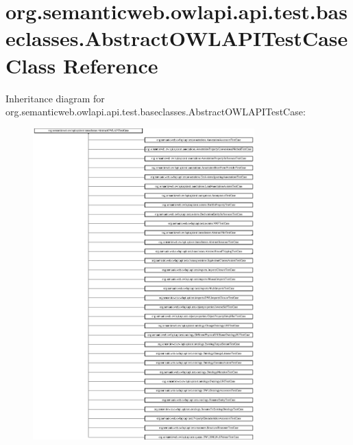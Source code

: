 \hypertarget{classorg_1_1semanticweb_1_1owlapi_1_1api_1_1test_1_1baseclasses_1_1_abstract_o_w_l_a_p_i_test_case}{\section{org.\-semanticweb.\-owlapi.\-api.\-test.\-baseclasses.\-Abstract\-O\-W\-L\-A\-P\-I\-Test\-Case Class Reference}
\label{classorg_1_1semanticweb_1_1owlapi_1_1api_1_1test_1_1baseclasses_1_1_abstract_o_w_l_a_p_i_test_case}
}
Inheritance diagram for org.\-semanticweb.\-owlapi.\-api.\-test.\-baseclasses.\-Abstract\-O\-W\-L\-A\-P\-I\-Test\-Case\-:\begin{figure}[H]
\begin{center}
\leavevmode
\includegraphics[height=12.000000cm]{classorg_1_1semanticweb_1_1owlapi_1_1api_1_1test_1_1baseclasses_1_1_abstract_o_w_l_a_p_i_test_case}
\end{center}
\end{figure}
